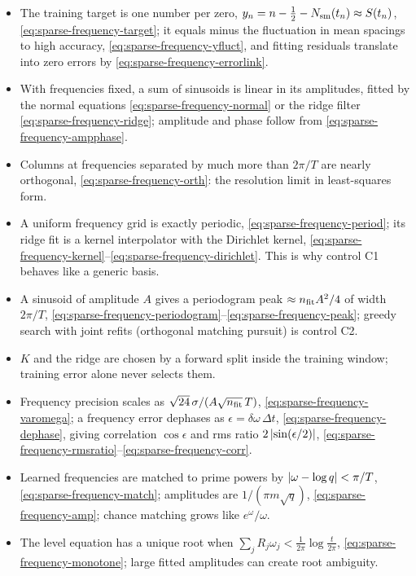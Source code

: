 \begin{itemize}
\item The training target is one number per zero, $y_n=n-\tfrac12-N_{\mathrm{sm}}(t_n)\approx S(t_n)$, \eqref{eq:sparse-frequency-target}; it equals minus the fluctuation in mean spacings to high accuracy, \eqref{eq:sparse-frequency-yfluct}, and fitting residuals translate into zero errors by \eqref{eq:sparse-frequency-errorlink}.
\item With frequencies fixed, a sum of sinusoids is linear in its amplitudes, fitted by the normal equations \eqref{eq:sparse-frequency-normal} or the ridge filter \eqref{eq:sparse-frequency-ridge}; amplitude and phase follow from \eqref{eq:sparse-frequency-ampphase}.
\item Columns at frequencies separated by much more than $2\pi/T$ are nearly orthogonal, \eqref{eq:sparse-frequency-orth}: the resolution limit in least-squares form.
\item A uniform frequency grid is exactly periodic, \eqref{eq:sparse-frequency-period}; its ridge fit is a kernel interpolator with the Dirichlet kernel, \eqref{eq:sparse-frequency-kernel}--\eqref{eq:sparse-frequency-dirichlet}. This is why control C1 behaves like a generic basis.
\item A sinusoid of amplitude $A$ gives a periodogram peak $\approx n_{\rm fit}A^2/4$ of width $2\pi/T$, \eqref{eq:sparse-frequency-periodogram}--\eqref{eq:sparse-frequency-peak}; greedy search with joint refits (orthogonal matching pursuit) is control C2.
\item $K$ and the ridge are chosen by a forward split inside the training window; training error alone never selects them.
\item Frequency precision scales as $\sqrt{24}\,\sigma/(A\sqrt{n_{\rm fit}}\,T)$, \eqref{eq:sparse-frequency-varomega}; a frequency error dephases as $\epsilon=\delta\omega\,\Delta t$, \eqref{eq:sparse-frequency-dephase}, giving correlation $\cos\epsilon$ and rms ratio $2\left\lvert \sin(\epsilon/2)\right\rvert$, \eqref{eq:sparse-frequency-rmsratio}--\eqref{eq:sparse-frequency-corr}.
\item Learned frequencies are matched to prime powers by $\left\lvert \omega-\log q\right\rvert<\pi/T$, \eqref{eq:sparse-frequency-match}; amplitudes are $1/(\pi m\sqrt q)$, \eqref{eq:sparse-frequency-amp}; chance matching grows like $e^\omega/\omega$.
\item The level equation has a unique root when $\sum_jR_j\omega_j<\frac1{2\pi}\log\frac t{2\pi}$, \eqref{eq:sparse-frequency-monotone}; large fitted amplitudes can create root ambiguity.
\end{itemize}

